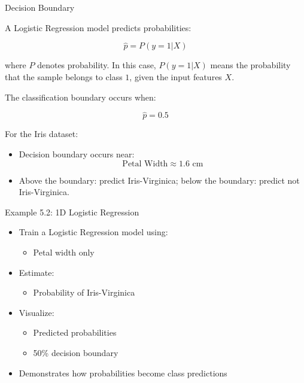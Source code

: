 \documentclass[aspectratio=169]{beamer}
\begin{document}
\begin{frame}{Decision Boundary}
	
	A Logistic Regression model predicts probabilities:
	
	\[
	\hat{p}=P(y=1|X)
	\]
	
	where \(P\) denotes probability. In this case, \(P(y=1|X)\) means the probability that the sample belongs to class \(1\), given the input features \(X\).
	
	\vspace{0.5em}
	
	The classification boundary occurs when:
	
	\[
	\hat{p}=0.5
	\]
	
	\vspace{0.5em}
	
	For the Iris dataset:
	
	\begin{itemize}
		\item Decision boundary occurs near:
		\[
		\text{Petal Width}\approx 1.6\text{ cm}
		\]
		
	\item Above the boundary: predict Iris-Virginica; below the boundary: predict not Iris-Virginica.
	\end{itemize}
	
\end{frame}


\begin{frame}{Example 5.2: 1D Logistic Regression}

\begin{itemize}
\item Train a Logistic Regression model using:
\begin{itemize}
\item Petal width only
\end{itemize}

\vspace{0.5em}

\item Estimate:
\begin{itemize}
\item Probability of Iris-Virginica
\end{itemize}

\vspace{0.5em}

\item Visualize:
\begin{itemize}
\item Predicted probabilities
\item 50\% decision boundary
\end{itemize}

\vspace{0.5em}

\item Demonstrates how probabilities become class predictions
\end{itemize}

\end{frame}
\end{document}
